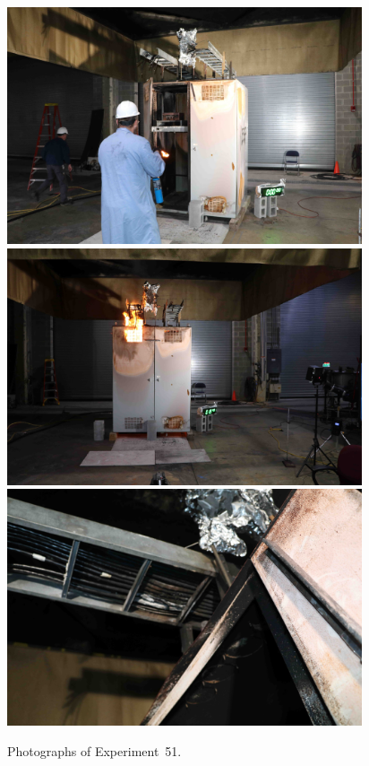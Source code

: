\documentclass[12pt]{article}
\begin{document}
\begin{figure}[p]
\centering
\includegraphics[height=2.75in]{../FIGURES/Test_51_setup} \\
\includegraphics[height=2.75in]{../FIGURES/Test_51_ignition} \\
\includegraphics[height=2.75in]{../FIGURES/Test_51_scar}
\caption[Photographs of Experiment~51]{Photographs of Experiment~51.}
\label{fig:Test_51_photos}
\end{figure}


\clearpage
\end{document}

